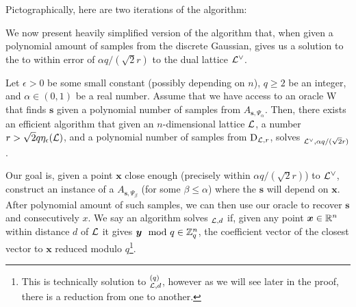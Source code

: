 Pictographically, here are two iterations of the algorithm:

We now present heavily simplified version of the algorithm that, when given a polynomial amount of samples from the discrete Gaussian, gives us a solution to the  to within error of $\alpha q /(\sqrt{2} r)$ to the dual lattice $\mathcal{L}^{\vee}$.
\begin{lemma}\label{classical}
	Let $\epsilon > 0$ be some small constant (possibly depending on $n$), $q \geq 2$ be an integer, and $\alpha \in (0, 1)$ be a real number. Assume that we have access to an oracle W that finds $\bm{s}$ given a polynomial number of samples from $A_{\bm{s},\Psi_{\alpha}}$. Then, there exists an efficient algorithm that given an $n$-dimensional lattice $\mathcal{L}$, a number $r > \sqrt{2}q \eta_{\epsilon}(\mathcal{L})$, and a polynomial number of samples from $\text{D}_{\mathcal{L},r}$, solves $_{\mathcal{L}^{\vee},\alpha q/(\sqrt{2}r)}$.
\end{lemma}
Our goal is, given a point $\bm{x}$ close enough (precisely within $\alpha q/(\sqrt{2}r)$) to $\mathcal{L}^{\vee}$, construct an instance of a $A_{\bm{s}, \Psi_{\beta}}$ (for some $\beta \leq \alpha$) where the $\bm{s}$ will depend on $\bm{x}$. After polynomial amount of such samples, we can then use our oracle to recover $\bm{s}$ and consecutively $x$. We say an algorithm solves $_{\mathcal{L}, d}$ if, given any point $\boldsymbol{x} \in \mathbb{R}^n$ within distance $d$ of $\mathcal{L}$ it gives $\boldsymbol{y} \mod q \in \mathbb{Z}_q^n$, the coefficient vector of the closest vector to $\bm{x}$ reduced modulo $q$\footnote{This is technically solution to $^{(q)}_{\mathcal{L}, d}$, however as we will see later in the proof, there is a reduction from one to another.}.

